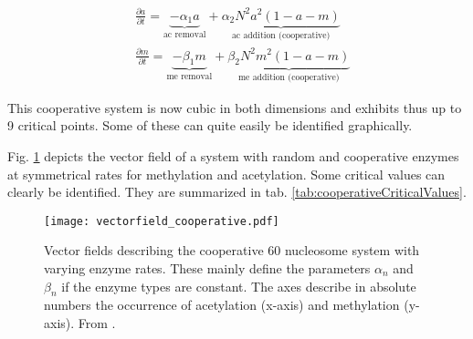             \begin{subequations}
                \begin{align}
                    &\frac{\partial a}{\partial t} = \underbrace{- \alpha_1 a }_{\textrm{ac removal}} + \underbrace{ \alpha_2 N^2 a^2 (1-a-m) }_{\textrm{ac addition (cooperative)}}\\
                    &\frac{\partial m}{\partial t} = \underbrace{- \beta_1 m }_{\textrm{me removal}} + \underbrace{ \beta_2 N^2 m^2 (1-a-m) }_{\textrm{me addition (cooperative)}}
                \end{align}
                \label{eqn:cooperative}
            \end{subequations}

            This cooperative system is now cubic in both dimensions and exhibits thus up to 9 critical points. Some of these can quite easily be identified graphically.

            Fig. \ref{img:cooperativeVectorField} depicts the vector field of a system with random and cooperative enzymes at symmetrical rates for methylation and acetylation. Some critical values can clearly be identified. They are summarized in tab. \ref{tab:cooperativeCriticalValues}.

            \begin{figure}[htbp!]
                \centering
                \texttt{[image: vectorfield\_cooperative.pdf]}
                \caption{Vector fields describing the cooperative 60 nucleosome system with varying enzyme rates. These mainly define the parameters $\alpha_n$ and $\beta_n$ if the enzyme types are constant. The axes describe in absolute numbers the occurrence of acetylation (x-axis) and methylation (y-axis). From \cite{mayer2020langevin}.}
                \label{img:cooperativeVectorField}
            \end{figure}

